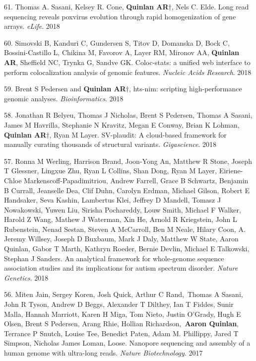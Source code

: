\documentclass[margin,line]{cv}
\begin{document}
\begin{resume}
\begin{list}{*}{}
    \item[61.] Thomas A. Sasani, Kelsey R. Cone, \textbf{Quinlan AR}$\dagger$, Nels C. Elde. Long read sequencing reveals poxvirus evolution through rapid homogenization of gene arrays. \emph{eLife}. 2018

    \item[60.] Simovski B, Kanduri C, Gundersen S, Titov D, Domanska D, Bock C, Bossini-Castillo L, Chikina M, Favorov A, Layer RM, Mironov AA, \textbf{Quinlan AR}, Sheffield NC, Trynka G, Sandve GK. Coloc-stats: a unified web interface to perform colocalization analysis of genomic features. \emph{Nucleic Acids Research}. 2018 

    \item[59.] Brent S Pedersen and \textbf{Quinlan AR}$\dagger$, hts-nim: scripting high-performance genomic analyses. \emph{Bioinformatics}. 2018

    \item[58.] Jonathan R Belyeu, Thomas J Nicholas, Brent S Pedersen, Thomas A Sasani, James M Havrilla, Stephanie N Kravitz, Megan E Conway, Brian K Lohman, \textbf{Quinlan AR}$\dagger$, Ryan M Layer. SV-plaudit: A cloud-based framework for manually curating thousands of structural variants. \emph{Gigascience}. 2018

    \item[57.] Ronna M Werling, Harrison Brand, Joon-Yong An, Matthew R Stone, Joseph T Glessner, Lingxue Zhu, Ryan L Collins, Shan Dong, Ryan M Layer, Eiriene-Chloe Markenscoff-Papadimitriou, Andrew Farrell, Grace B Schwartz, Benjamin B Currall, Jeanselle Dea, Clif Duhn, Carolyn Erdman, Michael Gilson, Robert E Handsaker, Seva Kashin, Lambertus Klei, Jeffrey D Mandell, Tomasz J Nowakowski, Yuwen Liu, Sirisha Pochareddy, Louw Smith, Michael F Walker, Harold Z Wang, Mathew J Waterman, Xin He, Arnold R Kriegstein, John L Rubenstein, Nenad Sestan, Steven A McCarroll, Ben M Neale, Hilary Coon, A. Jeremy Willsey, Joseph D Buxbaum, Mark J Daly, Matthew W State, Aaron Quinlan, Gabor T Marth, Kathryn Roeder, Bernie Devlin, Michael E Talkowski, Stephan J Sanders.
    An analytical framework for whole-genome sequence association studies and its implications for autism spectrum disorder. \emph{Nature Genetics}. 2018

    \item[56.] Miten Jain, Sergey Koren, Josh Quick, Arthur C Rand, Thomas A Sasani, John R Tyson, Andrew D Beggs, Alexander T Dilthey, Ian T Fiddes, Sunir Malla, Hannah Marriott, Karen H Miga, Tom Nieto, Justin O'Grady, Hugh E Olsen, Brent S Pedersen, Arang Rhie, Hollian Richardson, \textbf{Aaron Quinlan}, Terrance P Snutch, Louise Tee, Benedict Paten, Adam M. Phillippy, Jared T Simpson, Nicholas James Loman, Loose. 
    Nanopore sequencing and assembly of a human genome with ultra-long reads. \emph{Nature Biotechnology}. 2017


\end{list}
\end{resume}
\end{document}
